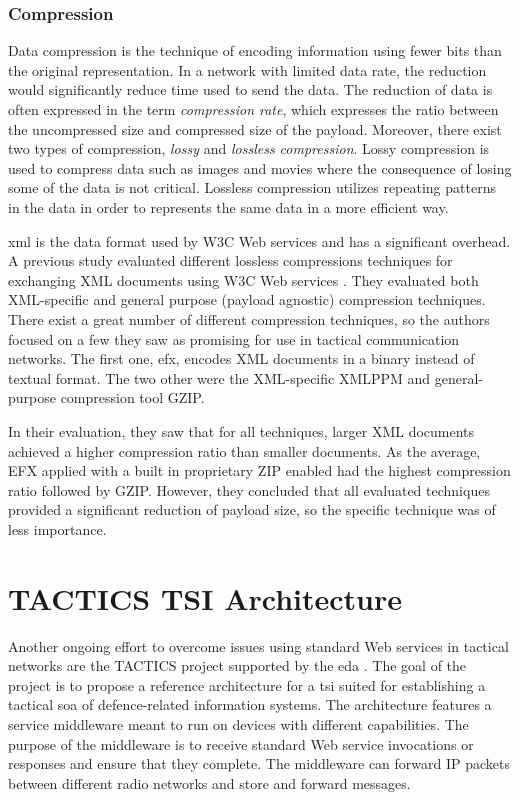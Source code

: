\subsubsection{Compression}

Data compression is the technique of encoding information using fewer bits than
the original representation. In a network with limited data rate, the reduction
would significantly reduce time used to send the data. The reduction of data is
often expressed in the term \textit{compression rate}, which expresses the ratio
between the uncompressed size and compressed size of the payload.  Moreover,
there exist two types of compression, \textit{lossy} and \textit{lossless
compression}. Lossy compression is used to compress data such as images and
movies where the consequence of losing some of the data is not critical.
Lossless compression utilizes repeating patterns in the data in order to
represents the same data in a more efficient way.

\gls{xml} is the data format used by W3C Web services and has a significant
overhead. A previous study evaluated different lossless compressions techniques
for exchanging XML documents using W3C Web services \cite{johnsen-compression}.
They evaluated both XML-specific and general purpose (payload agnostic)
compression techniques. There exist a great number of different compression
techniques, so the authors focused on a few they saw as promising for use in
tactical communication networks. The first one, \gls{efx}, encodes XML documents
in a binary instead of textual format. The two other were the XML-specific XMLPPM
and general-purpose compression tool GZIP.

In their evaluation, they saw that for all techniques, larger XML documents
achieved a higher compression ratio than smaller documents. As the average, EFX
applied with a built in proprietary ZIP enabled had the highest compression
ratio followed by GZIP. However, they concluded that all evaluated techniques
provided a significant reduction of payload size, so the specific technique was
of less importance.

\section{TACTICS TSI Architecture}

Another ongoing effort to overcome issues using standard Web services in
tactical networks are the TACTICS project supported by the \gls{eda}
\cite{tactics-diefenbach}. The goal of the project is to propose a reference
architecture for a \gls{tsi} suited for establishing a tactical \gls{soa} of
defence-related information systems. The architecture features a service
middleware meant to run on devices with different capabilities. The purpose of
the middleware is to receive standard Web service invocations or responses and
ensure that they complete. The middleware can forward IP packets between
different radio networks and store and forward messages.

